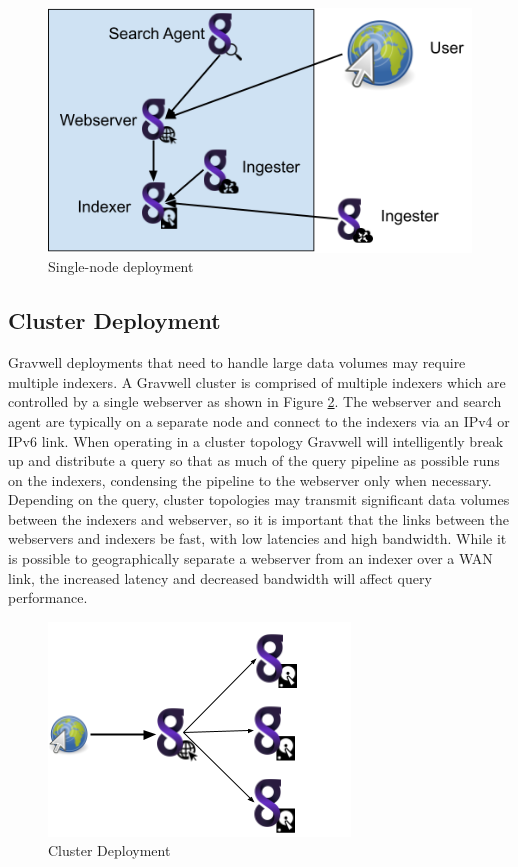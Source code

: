 {\begin{figure}
	\includegraphics[width=0.6\linewidth]{images/singlenode.png}
	\caption{Single-node deployment}
	\label{fig:singlenode}
\end{figure}


\subsection{Cluster Deployment}

Gravwell deployments that need to handle large data volumes may require
multiple indexers. A Gravwell cluster is comprised of multiple indexers
which are controlled by a single webserver as shown in Figure \ref{fig:cluster}. The webserver and
search agent are typically on a separate node and connect to the indexers
via an IPv4 or IPv6 link. When operating in a cluster topology Gravwell
will intelligently break up and distribute a query so that as much of
the query pipeline as possible runs on the indexers, condensing
the pipeline to the webserver only when necessary. Depending on the
query, cluster topologies may transmit significant data volumes between
the indexers and webserver, so it is important that the links between
the webservers and indexers be fast, with low latencies and high
bandwidth. While it is possible to geographically separate a webserver
from an indexer over a WAN link, the increased latency and decreased
bandwidth will affect query performance.

\begin{figure}
	\includegraphics[width=0.6\linewidth]{images/cluster.png}
	\caption{Cluster Deployment}
	\label{fig:cluster}
\end{figure}

}
